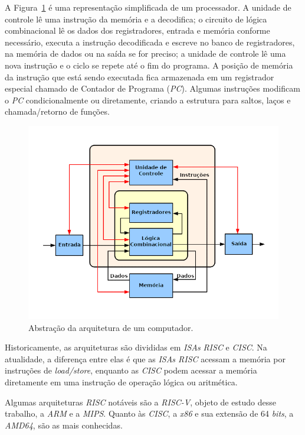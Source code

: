 {
    A Figura~\ref{fig:cpu_abstraction} é uma representação simplificada de um
    processador. A unidade de controle lê uma instrução da memória e a
    decodifica; o circuito de lógica combinacional lê os dados dos
    registradores, entrada e memória conforme necessário, executa a instrução
    decodificada e escreve no banco de registradores, na memória de dados ou
    na saída se for preciso; a unidade de controle lê uma nova instrução e o
    ciclo se repete até o fim do programa. A posição de memória da instrução
    que está sendo executada fica armazenada em um registrador especial chamado
    de Contador de Programa (\textit{PC}). Algumas instruções modificam o
    \textit{PC} condicionalmente ou diretamente, criando a estrutura para
    saltos, laços e chamada/retorno de funções.
}

\begin{figure}[H]
\centering
\includegraphics[width=.7\linewidth]
    {../images/ABasicComputer.png}
    \caption[Abstração da arquitetura de um computador]
    {Abstração da arquitetura de um
        computador.~\cite{wikimedia2015basiccpu}}\label{fig:cpu_abstraction}
\end{figure}

{
    Historicamente, as arquiteturas são divididas em \textit{ISAs}
    \textit{RISC} e \textit{CISC}. Na atualidade, a diferença entre elas é que
    as \textit{ISAs RISC} acessam a memória por instruções de
    \textit{load/store}, enquanto as \textit{CISC} podem acessar a memória
    diretamente em uma instrução de operação lógica ou aritmética.

    Algumas arquiteturas \textit{RISC} notáveis são a \textit{RISC-V}, objeto de
    estudo desse trabalho, a \textit{ARM} e a \textit{MIPS}. Quanto às
    \textit{CISC}, a \textit{x86} e sua extensão de 64 \textit{bits}, a
    \textit{AMD64}, são as mais conhecidas.
}

